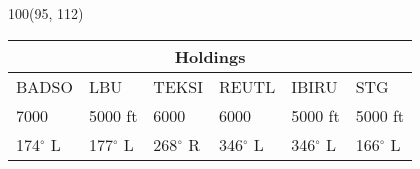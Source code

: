 \documentclass[10pt,landscape,a4paper]{article}
\begin{document}
\begin{textblock}{100}(95, 112)
\begin{table}[]
\begin{tabular}{|l|l|l|l|l|l|}
\multicolumn{6}{c}{\textbf{Holdings}} \\ \hline
BADSO & LBU & TEKSI & REUTL & IBIRU & STG \\ \hline
7000 & 5000 ft & 6000 & 6000 & 5000 ft & 5000 ft \\
174$^\circ$ L & 177$^\circ$ L & 268$^\circ$ R & 346$^\circ$ L & 346$^\circ$ L & 166$^\circ$ L \\ \hline
\end{tabular}
\end{table}
\end{textblock}
\end{document}
